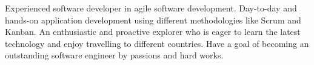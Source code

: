 

\begin{cvparagraph}

Experienced software developer in agile software development. Day-to-day and hands-on application development using different methodologies like Scrum and Kanban. An enthusiastic and proactive explorer who is eager to learn the latest technology and enjoy travelling to different countries. Have a goal of becoming an outstanding software engineer by passions and hard works.
\end{cvparagraph}

